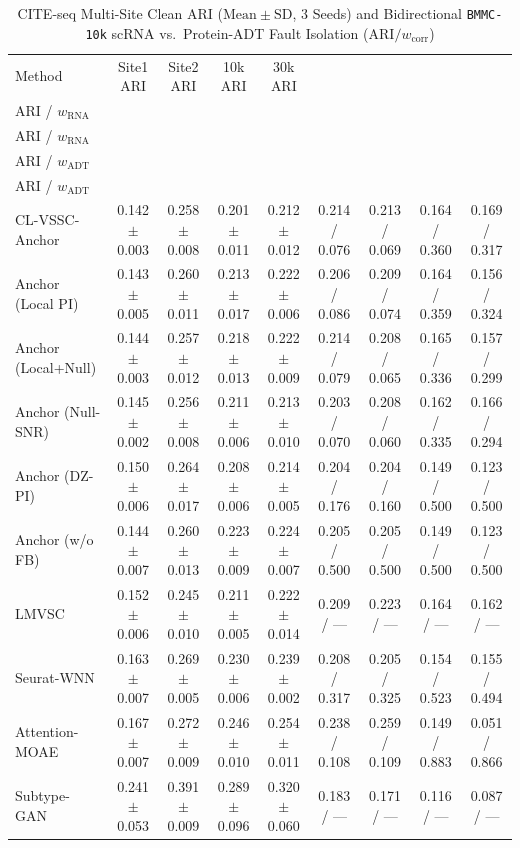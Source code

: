 \begin{table}[t]
\centering
\caption{CITE-seq Multi-Site Clean ARI ($\mathrm{Mean} \pm \mathrm{SD}$, 3 Seeds) and Bidirectional \texttt{BMMC-10k} scRNA vs.\ Protein-ADT Fault Isolation ($\mathrm{ARI} / w_{\mathrm{corr}}$)}
\label{tab:p2_stab4}
\scriptsize
\renewcommand{\arraystretch}{1.13}
\setlength{\tabcolsep}{2.0pt}
\begin{tabular}{lcccccccc}
\toprule
Method & Site1 ARI & Site2 ARI & 10k ARI & 30k ARI & \shortstack{scRNA $\sigma{=}1.5$\\ARI / $w_{\mathrm{RNA}}$} & \shortstack{scRNA $\sigma{=}3.0$\\ARI / $w_{\mathrm{RNA}}$} & \shortstack{ADT $\sigma{=}1.5$\\ARI / $w_{\mathrm{ADT}}$} & \shortstack{ADT $\sigma{=}3.0$\\ARI / $w_{\mathrm{ADT}}$} \\
\midrule
CL-VSSC-Anchor & 0.142$\pm$0.003 & 0.258$\pm$0.008 & 0.201$\pm$0.011 & 0.212$\pm$0.012 & 0.214 / 0.076 & 0.213 / 0.069 & 0.164 / 0.360 & 0.169 / 0.317 \\
Anchor (Local PI) & 0.143$\pm$0.005 & 0.260$\pm$0.011 & 0.213$\pm$0.017 & 0.222$\pm$0.006 & 0.206 / 0.086 & 0.209 / 0.074 & 0.164 / 0.359 & 0.156 / 0.324 \\
Anchor (Local+Null) & 0.144$\pm$0.003 & 0.257$\pm$0.012 & 0.218$\pm$0.013 & 0.222$\pm$0.009 & 0.214 / 0.079 & 0.208 / 0.065 & 0.165 / 0.336 & 0.157 / 0.299 \\
Anchor (Null-SNR) & 0.145$\pm$0.002 & 0.256$\pm$0.008 & 0.211$\pm$0.006 & 0.213$\pm$0.010 & 0.203 / 0.070 & 0.208 / 0.060 & 0.162 / 0.335 & 0.166 / 0.294 \\
Anchor (DZ-PI) & 0.150$\pm$0.006 & 0.264$\pm$0.017 & 0.208$\pm$0.006 & 0.214$\pm$0.005 & 0.204 / 0.176 & 0.204 / 0.160 & 0.149 / 0.500 & 0.123 / 0.500 \\
Anchor (w/o FB) & 0.144$\pm$0.007 & 0.260$\pm$0.013 & 0.223$\pm$0.009 & 0.224$\pm$0.007 & 0.205 / 0.500 & 0.205 / 0.500 & 0.149 / 0.500 & 0.123 / 0.500 \\
LMVSC & 0.152$\pm$0.006 & 0.245$\pm$0.010 & 0.211$\pm$0.005 & 0.222$\pm$0.014 & 0.209 / --- & 0.223 / --- & 0.164 / --- & 0.162 / --- \\
Seurat-WNN & 0.163$\pm$0.007 & 0.269$\pm$0.005 & 0.230$\pm$0.006 & 0.239$\pm$0.002 & 0.208 / 0.317 & 0.205 / 0.325 & 0.154 / 0.523 & 0.155 / 0.494 \\
Attention-MOAE & 0.167$\pm$0.007 & 0.272$\pm$0.009 & 0.246$\pm$0.010 & 0.254$\pm$0.011 & 0.238 / 0.108 & 0.259 / 0.109 & 0.149 / 0.883 & 0.051 / 0.866 \\
Subtype-GAN & 0.241$\pm$0.053 & 0.391$\pm$0.009 & 0.289$\pm$0.096 & 0.320$\pm$0.060 & 0.183 / --- & 0.171 / --- & 0.116 / --- & 0.087 / --- \\
\bottomrule
\end{tabular}
\end{table}
